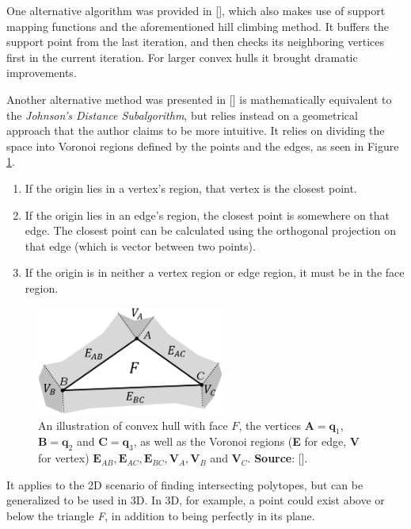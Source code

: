 One alternative algorithm was provided in [\citeauthor{Cameron2002}], which also makes use of support mapping functions and the aforementioned hill climbing method. It buffers the support point from the last iteration, and then checks its neighboring vertices first in the current iteration. For larger convex hulls it brought dramatic improvements.

Another alternative method was presented in [\citeauthor{Ericson2004}] is mathematically equivalent to the \textit{Johnson's Distance Subalgorithm}, but relies instead on a geometrical approach that the author claims to be more intuitive. It relies on dividing the space into Voronoi regions defined by the points and the edges, as seen in Figure \ref{fig:GJK_E}.
\begin{enumerate}
	\item If the origin lies in a vertex's region, that vertex is the closest point.
	\item If the origin lies in an edge's region, the closest point is somewhere on that edge. The closest point can be calculated using the orthogonal projection on that edge (which is vector between two points).
	\item If the origin is in neither a vertex region or edge region, it must be in the face region.
\end{enumerate}


\begin{figure}
	\centering
	\includegraphics[width=0.55\textwidth]{import/GJK_Ericson.png}
	\caption{An illustration of convex hull with face $F$, the vertices $\textbf{A} = \textbf{q}_1$, $\textbf{B} = \textbf{q}_2$ and $\textbf{C} = \textbf{q}_3$, as well as the Voronoi regions (\textbf{E} for edge, \textbf{V} for vertex) $\textbf{E}_{AB}, \textbf{E}_{AC}, \textbf{E}_{BC}, \textbf{V}_A, \textbf{V}_B$ and  $\textbf{V}_C$. \textbf{Source}: [\citeauthor{Ericson2004}]. }
	\label{fig:GJK_E}
\end{figure}

It applies to the 2D scenario of finding intersecting polytopes, but can be generalized to be used in 3D. In 3D, for example, a point could exist above or below the triangle \textit{F}, in addition to being perfectly in its plane.

